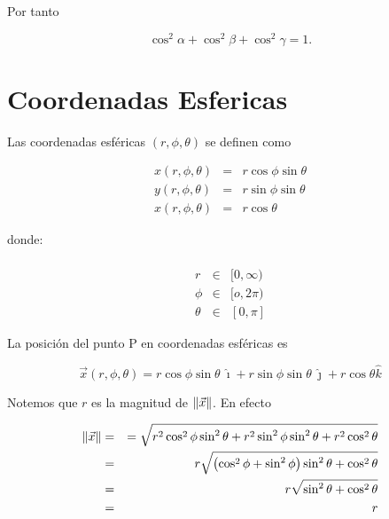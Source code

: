 \documentclass[12pt]{report}
\DeclarePairedDelimiter\norm{\lVert}{\rVert}
\begin{document}
Por tanto

\begin{equation}
\cos^2 \alpha + \cos^2 \beta + \cos^2 \gamma = 1.
\end{equation}














\section{Coordenadas Esfericas}

Las coordenadas esféricas $(r,\phi,\theta)$ se definen como

\begin{eqnarray} \nonumber
x(r,\phi,\theta) &=& r \cos \phi \sin \theta \\ \label{2.11}
y(r,\phi,\theta) &=& r \sin \phi \sin \theta \\ \nonumber
x(r,\phi,\theta) &=& r \cos \theta
\end{eqnarray}

 
 donde: \\
 \\
\begin{eqnarray} \nonumber
r &\in& [0, \infty) \\ \nonumber
\phi &\in& [o,2\pi) \\ \nonumber
\theta &\in& [0, \pi]
\end{eqnarray}
 


La posición del punto P en coordenadas esféricas es

\begin{equation}\label{2.12}
 \vec{x}(r,\phi,\theta)=r \cos \phi \sin \theta \ \hat{\imath} +  r \sin \phi \sin \theta \ \hat{\jmath} + r \cos \theta \hat{k} 
\end{equation}

Notemos que $r$ es la magnitud de $\norm{\vec{x}}$. En efecto

\begin{eqnarray} \nonumber
\norm{\vec{x}}&=&=\sqrt{r^2 \cos^2 \phi \sin^2 \theta +  r^2 \sin^2 \phi \sin^2 \theta + r^2 \cos^2 \theta } \\ \nonumber
&=&  r \sqrt{\left(\cos^2 \phi +  \sin^2 \phi \right) \sin^2 \theta  + \cos^2 \theta} \\ \nonumber
&=& r \sqrt{\sin^2 \theta + \cos^2 \theta} \\ \nonumber
&=& r
\end{eqnarray}
\end{document}
